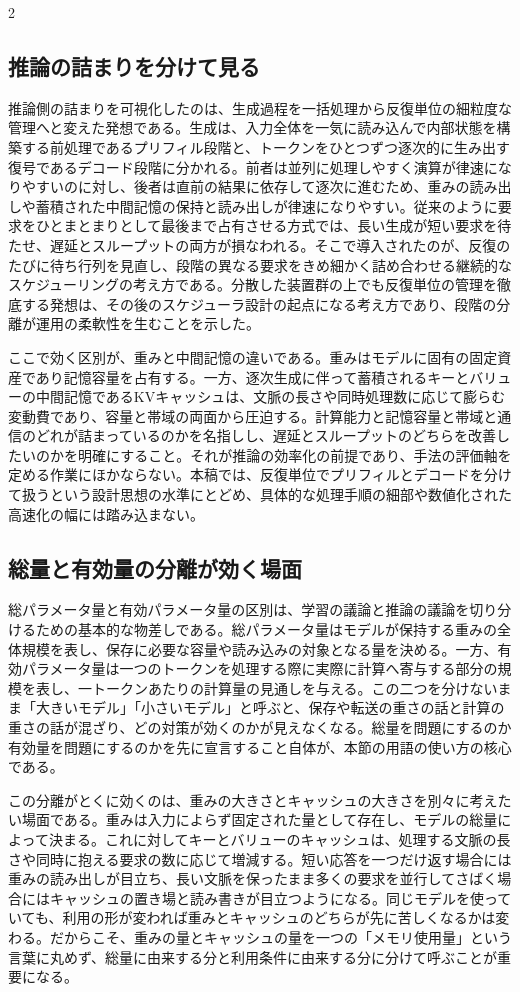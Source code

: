 \documentclass[lualatex,a4paper,10pt]{jlreq}
\begin{document}
\begin{multicols}{2}
\subsection{推論の詰まりを分けて見る}
推論側の詰まりを可視化したのは、生成過程を一括処理から反復単位の細粒度な管理へと変えた発想である\autocite{orca}。生成は、入力全体を一気に読み込んで内部状態を構築する前処理であるプリフィル段階と、トークンをひとつずつ逐次的に生み出す復号であるデコード段階に分かれる。前者は並列に処理しやすく演算が律速になりやすいのに対し、後者は直前の結果に依存して逐次に進むため、重みの読み出しや蓄積された中間記憶の保持と読み出しが律速になりやすい。従来のように要求をひとまとまりとして最後まで占有させる方式では、長い生成が短い要求を待たせ、遅延とスループットの両方が損なわれる。そこで導入されたのが、反復のたびに待ち行列を見直し、段階の異なる要求をきめ細かく詰め合わせる継続的なスケジューリングの考え方である。分散した装置群の上でも反復単位の管理を徹底する発想は、その後のスケジューラ設計の起点になる考え方であり、段階の分離が運用の柔軟性を生むことを示した。

ここで効く区別が、重みと中間記憶の違いである。重みはモデルに固有の固定資産であり記憶容量を占有する。一方、逐次生成に伴って蓄積されるキーとバリューの中間記憶であるKVキャッシュは、文脈の長さや同時処理数に応じて膨らむ変動費であり、容量と帯域の両面から圧迫する。計算能力と記憶容量と帯域と通信のどれが詰まっているのかを名指しし、遅延とスループットのどちらを改善したいのかを明確にすること。それが推論の効率化の前提であり、手法の評価軸を定める作業にほかならない。本稿では、反復単位でプリフィルとデコードを分けて扱うという設計思想の水準にとどめ、具体的な処理手順の細部や数値化された高速化の幅には踏み込まない。

\subsection{総量と有効量の分離が効く場面}
総パラメータ量と有効パラメータ量の区別は、学習の議論と推論の議論を切り分けるための基本的な物差しである。総パラメータ量はモデルが保持する重みの全体規模を表し、保存に必要な容量や読み込みの対象となる量を決める。一方、有効パラメータ量は一つのトークンを処理する際に実際に計算へ寄与する部分の規模を表し、一トークンあたりの計算量の見通しを与える。この二つを分けないまま「大きいモデル」「小さいモデル」と呼ぶと、保存や転送の重さの話と計算の重さの話が混ざり、どの対策が効くのかが見えなくなる。総量を問題にするのか有効量を問題にするのかを先に宣言すること自体が、本節の用語の使い方の核心である。

この分離がとくに効くのは、重みの大きさとキャッシュの大きさを別々に考えたい場面である。重みは入力によらず固定された量として存在し、モデルの総量によって決まる。これに対してキーとバリューのキャッシュは、処理する文脈の長さや同時に抱える要求の数に応じて増減する。短い応答を一つだけ返す場合には重みの読み出しが目立ち、長い文脈を保ったまま多くの要求を並行してさばく場合にはキャッシュの置き場と読み書きが目立つようになる。同じモデルを使っていても、利用の形が変われば重みとキャッシュのどちらが先に苦しくなるかは変わる。だからこそ、重みの量とキャッシュの量を一つの「メモリ使用量」という言葉に丸めず、総量に由来する分と利用条件に由来する分に分けて呼ぶことが重要になる。


\end{multicols}
\end{document}
